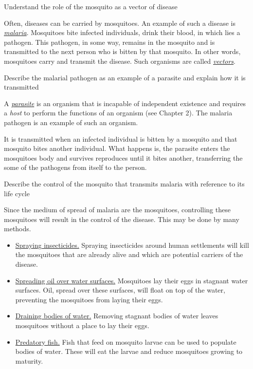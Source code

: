 \begin{point}
Understand the role of the mosquito as a vector of disease
\end{point}

Often, diseases can be carried by mosquitoes. An example of such a disease is 
\underline{\emph{malaria}}. Mosquitoes bite infected individuals, drink their blood, in which lies
a pathogen. This pathogen, in some way, remains in the mosquito and is transmitted to the next
person who is bitten by that mosquito. In other words, mosquitoes carry and transmit the disease.
Such organisms are called \underline{\emph{vectors}}.

\begin{point}
Describe the malarial pathogen as an example of a parasite and explain how it is transmitted
\end{point}

A \underline{\emph{parasite}} is an organism that is incapable of independent existence and 
requires a \emph{host} to perform the functions of an organism (see Chapter 2). The malaria
pathogen is an example of such an organism. 

It is transmitted when an infected individual is bitten by a mosquito and that mosquito bites
another individual. What happens is, the parasite enters the mosquitoes body and survives
reproduces until it bites another, transferring the some of the 
pathogens from itself to the person.\newpage

\begin{point}
Describe the control of the mosquito that transmits malaria with reference to its life cycle
\end{point}

Since the medium of spread of malaria are the mosquitoes, controlling these mosquitoes will
result in the control of the disease. This may be done by many methods.

\begin{itemize}[]
\item\underline{Spraying insecticides.} Spraying insecticides around human settlements will kill
the mosquitoes that are already alive and which are potential carriers of the disease.

\item\underline{Spreading oil over water surfaces.} Mosquitoes lay their eggs in stagnant water
surfaces. Oil, spread over these surfaces, will float on top of the water, preventing the 
mosquitoes from laying their eggs.

\item\underline{Draining bodies of water.} Removing stagnant bodies of water leaves mosquitoes without
a place to lay their eggs.

\item\underline{Predatory fish.} Fish that feed on mosquito larvae can be used to populate bodies of
water. These will eat the larvae and reduce mosquitoes growing to maturity.
\end{itemize}


